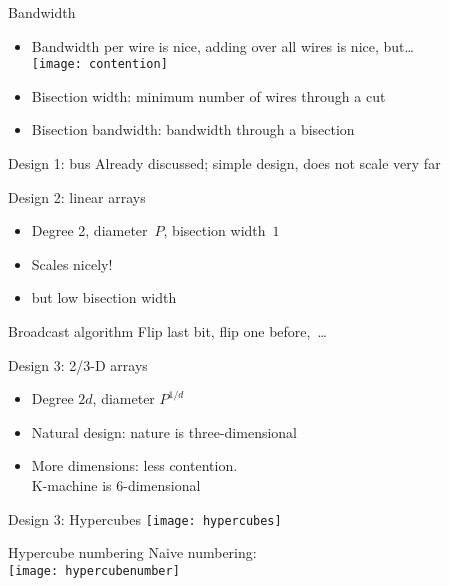 \begin{numberedframe}{Bandwidth}
  \begin{itemize}
  \item Bandwidth per wire is nice, adding over all wires is nice, but\ldots\\
  \texttt{[image: contention]}
  \item Bisection width: minimum number of wires through a cut
  \item Bisection bandwidth: bandwidth through a bisection
  \end{itemize}
\end{numberedframe}

\begin{numberedframe}{Design 1: bus}
  Already discussed; simple design, does not scale very far
\end{numberedframe}

\begin{numberedframe}{Design 2: linear arrays}
  \begin{itemize}
  \item Degree 2, diameter~$P$, bisection width~$1$
  \item Scales nicely!
  \item but low bisection width
  \end{itemize}
\end{numberedframe}

\begin{exercise}{Broadcast algorithm}
  Flip last bit, flip one before,~\ldots
\end{exercise}

\begin{numberedframe}{Design 3: 2/3-D arrays}
  \begin{itemize}
  \item Degree $2d$, diameter $P^{1/d}$
  \item Natural design: nature is three-dimensional
  \item More dimensions: less contention.\\ K-machine is 6-dimensional
  \end{itemize}
\end{numberedframe}

\begin{numberedframe}{Design 3: Hypercubes}
  \texttt{[image: hypercubes]}
\end{numberedframe}

\begin{numberedframe}{Hypercube numbering}
  Naive numbering:\\
  \texttt{[image: hypercubenumber]}
\end{numberedframe}

